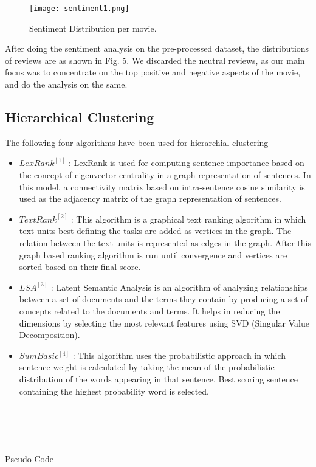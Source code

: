 \documentclass[conference]{IEEEtran}
\begin{document}
\begin{figure}[h!]
  \texttt{[image: sentiment1.png]}
  \caption{Sentiment Distribution per movie.}
  \label{fig:boat1}
\end{figure}

After doing the sentiment analysis on the pre-processed dataset, the distributions of reviews are as shown in Fig. 5. We discarded the neutral reviews, as our main focus was to concentrate on the top positive and negative aspects of the movie, and do the analysis on the same.

\subsection{Hierarchical Clustering}
The following four algorithms have been used for hierarchial clustering - 
\begin{itemize}
\item $LexRank^{[1]}$ : LexRank is used for computing sentence importance based on the concept of eigenvector centrality in a graph representation of sentences. In this model, a connectivity matrix based on intra-sentence cosine similarity is used as the adjacency matrix of the graph representation of sentences.
\item $TextRank^{[2]}$ : This algorithm is a graphical text ranking algorithm in which text units best defining the tasks are added as vertices in the graph. The relation between the text units is represented as edges in the graph. After this graph based ranking algorithm is run until convergence and vertices are sorted based on their final score.
\item $LSA^{[3]}$ : Latent Semantic Analysis is an algorithm of analyzing relationships between a set of documents and the terms they contain by producing a set of concepts related to the documents and terms. It helps in reducing the dimensions by selecting the most relevant features using SVD (Singular Value Decomposition).
\item $SumBasic^{[4]}$ : This algorithm uses the probabilistic approach in which sentence weight is calculated by taking the mean of the probabilistic distribution of the words appearing in that sentence. Best scoring sentence containing the highest probability word is selected.
\end{itemize}\\
\\
\\
\\
Pseudo-Code \\
\end{document}
